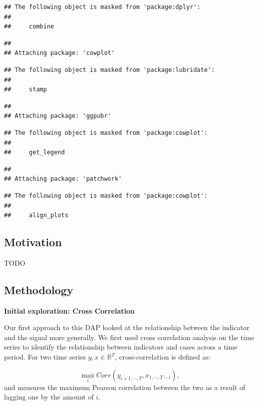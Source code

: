 \documentclass[]{article}
\begin{document}
\begin{verbatim}
## The following object is masked from 'package:dplyr':
## 
##     combine
\end{verbatim}

\begin{verbatim}
## 
## Attaching package: 'cowplot'
\end{verbatim}

\begin{verbatim}
## The following object is masked from 'package:lubridate':
## 
##     stamp
\end{verbatim}

\begin{verbatim}
## 
## Attaching package: 'ggpubr'
\end{verbatim}

\begin{verbatim}
## The following object is masked from 'package:cowplot':
## 
##     get_legend
\end{verbatim}

\begin{verbatim}
## 
## Attaching package: 'patchwork'
\end{verbatim}

\begin{verbatim}
## The following object is masked from 'package:cowplot':
## 
##     align_plots
\end{verbatim}

\hypertarget{motivation}{%
\subsection{Motivation}\label{motivation}}

TODO

\hypertarget{methodology}{%
\subsection{Methodology}\label{methodology}}

\textbf{Initial exploration: Cross Correlation}

Our first approach to this DAP looked at the relationship between the
indicator and the signal more generally. We first used cross correlation
analysis on the time series to identify the relationship between
indicators and cases across a time period. For two time series
\(y, x \in \mathbb{R}^T\), cross-correlation is defined as:

\[\max_{i} Corr(y_{i+1,\cdots, T}, x_{1, \cdots, T-i}),\] and measures
the maximum Pearson correlation between the two as a result of lagging
one by the amount of \(i\).
\end{document}
